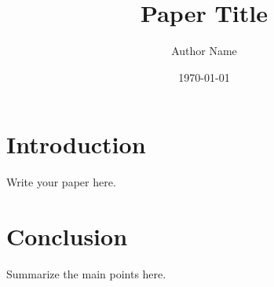 \documentclass[a4paper,11pt]{jsarticle}
\title{Paper Title}
\author{Author Name}
\date{\today}
\begin{document}
\maketitle

\section{Introduction}

Write your paper here.

\section{Conclusion}

Summarize the main points here.



\end{document}
